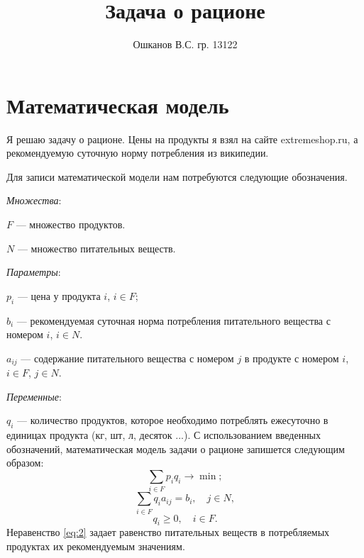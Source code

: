 \documentclass[]{article}
\title{Задача о рационе}
\author{Ошканов В.С. гр. 13122}
\begin{document}
\maketitle
\section{Математическая модель}
Я решаю задачу о рационе. Цены на продукты я взял на сайте extremeshop.ru, а рекомендуемую суточную норму потребления из википедии.

Для записи математической модели нам потребуются следующие обозначения.
\par
\textit{Множества}:
\par\noindent
$F$ --- множество продуктов.
\par\noindent
$N$ --- множество питательных веществ.
\par
\textit{Параметры}:
\par\noindent
$p_i$ --- цена у продукта $i$, $i\in F$;
\par\noindent
$b_{i}$ --- рекомендуемая суточная норма потребления питательного вещества с номером $i$, $i\in N$.
\par\noindent
$a_{ij}$ --- содержание питательного вещества с номером $j$ в продукте с номером $i$, $i\in F$, $j\in N$.
\par
\textit{Переменные}:
\par\noindent
$q_i$ --- количество продуктов, которое необходимо потреблять ежесуточно в
единицах продукта (кг, шт, л, десяток ...).
С использованием введенных обозначений, математическая модель задачи о рационе
запишется следующим образом:
\begin{equation}
\sum_{i\in F}p_iq_i\rightarrow\min;
\end{equation}
\begin{equation}\label{eq:2}
	\sum_{i\in F}
			q_ia_{ij} = b_i,\quad j\in N,
\end{equation}
\begin{equation}
      q_i \geq 0,\quad i\in F.
\end{equation}
Неравенство \eqref{eq:2} задает равенство питательных веществ в потребляемых продуктах
их рекомендуемым значениям.
\end{document}
